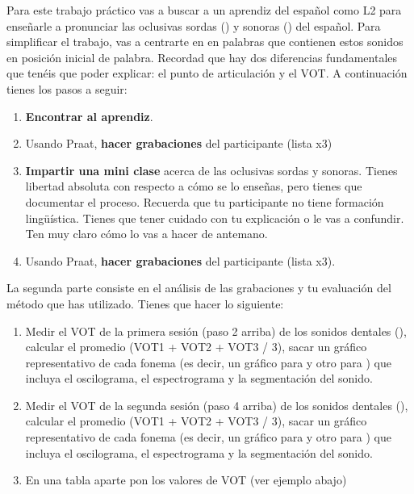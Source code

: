 \documentclass[12pt]{article}
\begin{document}
\noindent Para este trabajo práctico vas a buscar a un aprendiz del español como 
L2 para enseñarle a pronunciar las oclusivas sordas () y 
sonoras () del español. Para simplificar el trabajo, vas a 
centrarte en  en palabras que contienen estos sonidos en 
posición inicial de palabra. 
Recordad que hay dos diferencias fundamentales que tenéis que poder explicar: el 
punto de articulación y el VOT. A continuación tienes los pasos a seguir:

\begin{enumerate}
	\item \textbf{Encontrar al aprendiz}.
	\item Usando Praat, \textbf{hacer grabaciones} del participante (lista x3)
	\item \textbf{Impartir una mini clase} acerca de las oclusivas sordas y sonoras. 
	Tienes libertad absoluta con respecto a cómo se lo enseñas, pero tienes que 
	documentar el proceso. Recuerda que tu participante no tiene formación lingüística. 
	Tienes que tener cuidado con tu explicación o le vas a confundir. Ten muy claro cómo 
	lo vas a hacer de antemano. 
	\item Usando Praat, \textbf{hacer grabaciones} del participante (lista x3).
\end{enumerate}

\noindent La segunda parte consiste en el análisis de las grabaciones y tu evaluación 
del método que has utilizado. Tienes que hacer lo siguiente:

\begin{enumerate}
	\item Medir el VOT de la primera sesión (paso 2 arriba) de los sonidos dentales (), 
	calcular el promedio (VOT1 + VOT2 + VOT3 / 3), sacar un gráfico representativo de cada fonema 
	(es decir, un gráfico para  y otro para ) que incluya el oscilograma, 
	el espectrograma y la segmentación del sonido.
	\item Medir el VOT de la segunda sesión (paso 4 arriba) de los sonidos dentales (), 
	calcular el promedio (VOT1 + VOT2 + VOT3 / 3), sacar un gráfico representativo de cada fonema 
	(es decir, un gráfico para  y otro para ) que incluya el oscilograma, 
	el espectrograma y la segmentación del sonido.
	\item En una tabla aparte pon los valores de VOT (ver ejemplo abajo)
\end{enumerate}
\end{document}
